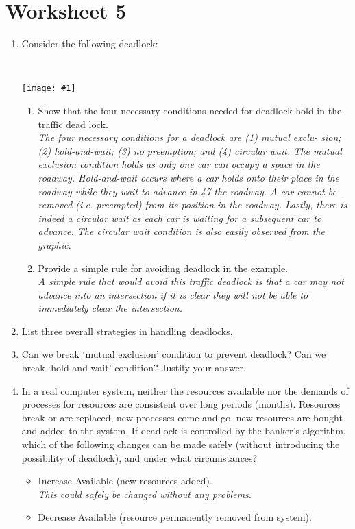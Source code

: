 \documentclass{article}
\newcommand{\answercolor}{Bittersweet}
\newcommand{\answer}[1]{{\\\color{\answercolor}\footnotesize\itshape{#1}}}
\newcommand{\answerimg}[1]{\answer{\begin{figure*}[h]\centering\texttt{[image: \#1]}\end{figure*}}}
\begin{document}
	\raggedright
	\tableofcontents
	\section{Worksheet 5}
	\begin{enumerate}
		\item Consider the following deadlock:
		\answerimg{T5Q1.png}
		\begin{enumerate}
			\item Show that the four necessary conditions needed for deadlock hold in the traffic dead lock.
			\answer{The four necessary conditions for a deadlock are (1) mutual exclu- sion; (2) hold-and-wait; (3) no preemption; and (4) circular wait. The mutual exclusion condition holds as only one car can occupy a space in the roadway. Hold-and-wait occurs where a car holds onto their place in the roadway while they wait to advance in 47 the roadway. A car cannot be removed (i.e. preempted) from its position in the roadway. Lastly, there is indeed a circular wait as each car is waiting for a subsequent car to advance. The circular wait condition is also easily observed from the graphic.}
			\item Provide a simple rule for avoiding deadlock in the example.
			\answer{A simple rule that would avoid this traffic deadlock is that a car may not advance into an intersection if it is clear they will not be able to immediately clear the intersection. }
		\end{enumerate}
		\item List three overall strategies in handling deadlocks.
		\item Can we break ‘mutual exclusion’ condition to prevent deadlock? Can we break ‘hold and wait’ condition? Justify your answer.
		\item In a real computer system, neither the resources available nor the demands of processes for resources are consistent over long periods (months). Resources break or are replaced, new processes come and go, new resources are bought and added to the system. If deadlock is controlled by the banker’s algorithm, which of the following changes can be made safely (without introducing the possibility of deadlock), and under what circumstances?
		\begin{itemize}
			\item Increase Available (new resources added).
			\answer{This could safely be changed without any problems.}
			\item Decrease Available (resource permanently removed from system).

\end{itemize}
\end{enumerate}
\end{document}
